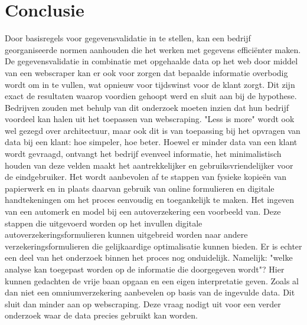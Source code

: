 
\chapter{Conclusie}
\label{ch:conclusie}


Door basisregels voor gegevensvalidatie in te stellen, kan een bedrijf georganiseerde normen aanhouden die het werken met gegevens efficiënter maken.
De gegevensvalidatie in combinatie met opgehaalde data op het web door middel van een webscraper kan er ook voor zorgen dat bepaalde informatie overbodig wordt om in te vullen, wat opnieuw voor tijdswinst voor de klant zorgt. Dit zijn exact de resultaten waarop voordien gehoopt werd en sluit aan bij de hypothese. Bedrijven zouden met behulp van dit onderzoek moeten inzien dat hun bedrijf voordeel kan halen uit het toepassen van webscraping. "Less is more" wordt ook wel gezegd over architectuur, maar ook dit is van toepassing bij het opvragen van data bij een klant: hoe simpeler, hoe beter. Hoewel er minder data van een klant wordt gevraagd, ontvangt het bedrijf evenveel informatie, het minimalistisch houden van deze velden maakt het aantrekkelijker en gebruiksvriendelijker voor de eindgebruiker. Het wordt aanbevolen af te stappen van fysieke kopieën van papierwerk en in plaats daarvan gebruik van online formulieren en digitale handtekeningen om het proces eenvoudig en toegankelijk te maken. Het ingeven van een automerk en model bij een autoverzekering een voorbeeld van. Deze stappen die uitgevoerd worden op het invullen digitale autoverzekeringsformulieren kunnen uitgebreid worden naar andere verzekeringsformulieren die gelijkaardige optimalisatie kunnen bieden. Er is echter een deel van het onderzoek binnen het proces nog onduidelijk. Namelijk: "welke analyse kan toegepast worden op de informatie die doorgegeven wordt"? Hier kunnen gedachten de vrije baan opgaan en een eigen interpretatie geven. Zoals al dan niet een omniumverzekering aanbevelen op basis van de ingevulde data. Dit sluit dan minder aan op webscraping. Deze vraag nodigt uit voor een verder onderzoek waar de data precies gebruikt kan worden.

